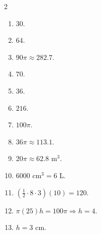 \documentclass[11pt]{article}
\begin{document}
\begin{keybox}
\begin{multicols}{2}
\small
\begin{enumerate}[leftmargin=*,itemsep=3pt]
  \item $30$.
  \item $64$.
  \item $90\pi\approx282.7$.
  \item $70$.
  \item $36$.
  \item $216$.
  \item $100\pi$.
  \item $36\pi\approx113.1$.
  \item $20\pi\approx62.8$ m$^3$.
  \item $6000$ cm$^3=6$ L.
  \item $(\tfrac12\cdot8\cdot3)(10)=120$.
  \item $\pi(25)h=100\pi\Rightarrow h=4$.
  \item $h=3$ cm.
\end{enumerate}
\end{multicols}
\end{keybox}
\end{document}
